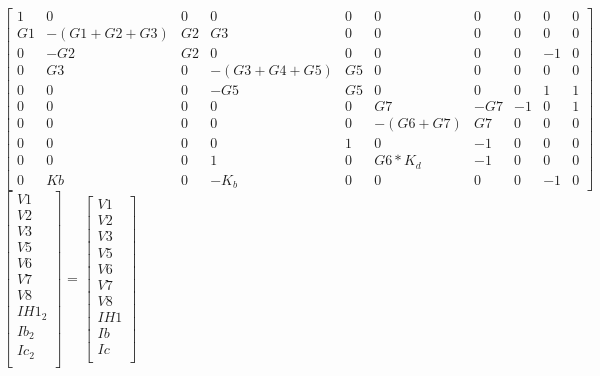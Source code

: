 {$ \begin{bmatrix}
1 & 0 & 0 & 0 & 0 & 0 & 0 & 0 & 0 & 0 \\
G1 & -(G1+G2+G3) & G2 & G3 & 0 & 0 & 0 & 0 & 0 & 0 \\
0 & -G2 & G2 & 0 & 0 & 0 & 0 & 0 & -1 & 0 \\
0 & G3 & 0 & -(G3+G4+G5) & G5 & 0 & 0 & 0 & 0 & 0 \\
0 & 0 & 0 & -G5 & G5 & 0 & 0 & 0 & 1 & 1 \\
0 & 0 & 0 & 0 & 0 & G7 & -G7 & -1 & 0 & 1 \\
0 & 0 & 0 & 0 & 0 & -(G6+G7) & G7 & 0 & 0 & 0 \\
0 & 0 & 0 & 0 & 1 & 0 & -1 & 0 & 0 & 0 \\
0 & 0 & 0 & 1 & 0 & G6*K_d & -1 & 0 & 0 & 0 \\
0 & Kb & 0 & -K_b & 0 & 0 & 0 & 0 & -1 & 0 
\end{bmatrix}  $
$ \begin{bmatrix}
V1 \\
V2 \\
V3 \\
V5 \\
V6 \\
V7 \\
V8 \\
IH1_2 \\
Ib_2 \\
Ic_2 \\
\end{bmatrix}  $
=
$ \begin{bmatrix}
V1 \\
V2 \\
V3 \\
V5 \\
V6 \\
V7 \\
V8 \\
IH1 \\
Ib \\
Ic \\
\end{bmatrix}  $

}
